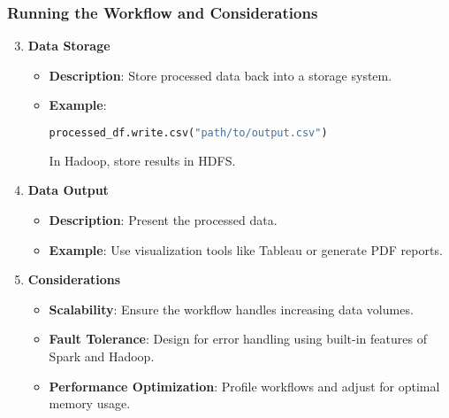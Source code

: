\documentclass[aspectratio=169]{beamer}
\begin{document}
\begin{frame}[fragile]
    \frametitle{Running the Workflow and Considerations}
    \begin{enumerate}
        \setcounter{enumi}{2}
        \item \textbf{Data Storage}
            \begin{itemize}
                \item \textbf{Description}: Store processed data back into a storage system.
                \item \textbf{Example}: 
                \begin{lstlisting}[language=Python]
                processed_df.write.csv("path/to/output.csv")
                \end{lstlisting}
                In Hadoop, store results in HDFS.
            \end{itemize}
        
        \item \textbf{Data Output}
            \begin{itemize}
                \item \textbf{Description}: Present the processed data.
                \item \textbf{Example}: Use visualization tools like Tableau or generate PDF reports.
            \end{itemize}
        
        \item \textbf{Considerations}
            \begin{itemize}
                \item \textbf{Scalability}: Ensure the workflow handles increasing data volumes.
                \item \textbf{Fault Tolerance}: Design for error handling using built-in features of Spark and Hadoop.
                \item \textbf{Performance Optimization}: Profile workflows and adjust for optimal memory usage.
            \end{itemize}
    \end{enumerate}
\end{frame}
\end{document}
